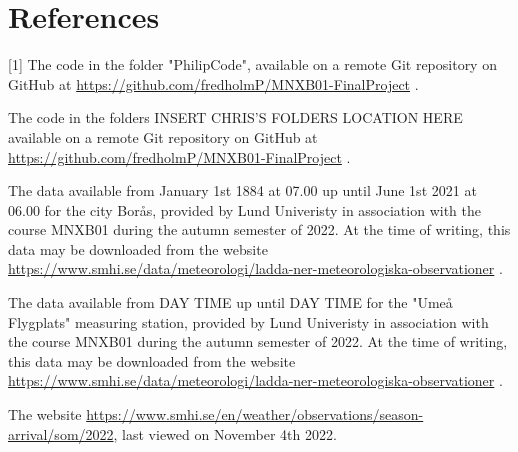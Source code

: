\documentclass[a4, 12pt]{article}
\begin{document}
\newpage
\section{References}
[1] The code in the folder "PhilipCode", available on a remote Git repository on GitHub at \href{https://github.com/fredholmP/MNXB01-FinalProject}{https://github.com/fredholmP/MNXB01-FinalProject} . \newline

\noindent [2] The code in the folders INSERT CHRIS'S FOLDERS LOCATION HERE available on a remote Git repository on GitHub at \href{https://github.com/fredholmP/MNXB01-FinalProject}{https://github.com/fredholmP/MNXB01-FinalProject} . \newline

\noindent [3] The data available from January 1st 1884 at 07.00 up until June 1st 2021 at 06.00 for the city Borås, provided by Lund Univeristy in association with the course MNXB01 during the autumn semester of 2022. At the time of writing, this data may be downloaded from the website \href{https://www.smhi.se/data/meteorologi/ladda-ner-meteorologiska-observationer}{https://www.smhi.se/data/meteorologi/ladda-ner-meteorologiska-observationer}  . \newline


\noindent [4] The data available from DAY TIME up until DAY TIME for the "Umeå Flygplats" measuring station, provided by Lund Univeristy in association with the course MNXB01 during the autumn semester of 2022. At the time of writing, this data may be downloaded from the website \href{https://www.smhi.se/data/meteorologi/ladda-ner-meteorologiska-observationer}{https://www.smhi.se/data/meteorologi/ladda-ner-meteorologiska-observationer} . \newline

\noindent [5] The website \href{https://www.smhi.se/en/weather/observations/season-arrival/som/2022}{https://www.smhi.se/en/weather/observations/season-arrival/som/2022}, last viewed on November 4th 2022.
\end{document}
